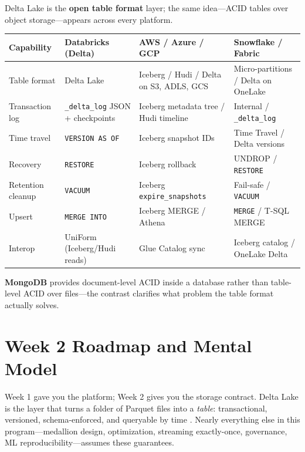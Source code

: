 \begin{crosscloud}
Delta Lake is the \textbf{open table format} layer; the same idea---ACID tables over object
storage---appears across every platform.

\vspace{2mm}
{\footnotesize
\begin{tabular}{@{}p{3.0cm}p{3.4cm}p{3.2cm}p{3.2cm}@{}}
\toprule
\textbf{Capability} & \textbf{Databricks (Delta)} & \textbf{AWS / Azure / GCP} & \textbf{Snowflake / Fabric} \\
\midrule
Table format & Delta Lake & Iceberg / Hudi / Delta on S3, ADLS, GCS & Micro-partitions / Delta on OneLake \\
Transaction log & \texttt{\_delta\_log} JSON + checkpoints & Iceberg metadata tree / Hudi timeline & Internal / \texttt{\_delta\_log} \\
Time travel & \texttt{VERSION AS OF} & Iceberg snapshot IDs & Time Travel / Delta versions \\
Recovery & \texttt{RESTORE} & Iceberg rollback & UNDROP / \texttt{RESTORE} \\
Retention cleanup & \texttt{VACUUM} & Iceberg \texttt{expire\_snapshots} & Fail-safe / \texttt{VACUUM} \\
Upsert & \texttt{MERGE INTO} & Iceberg MERGE / Athena & \texttt{MERGE} / T-SQL MERGE \\
\addlinespace
Interop & UniForm (Iceberg/Hudi reads) & Glue Catalog sync & Iceberg catalog / OneLake Delta \\
\bottomrule
\end{tabular}}

\vspace{1mm}
\textbf{MongoDB} provides document-level ACID inside a database rather than table-level ACID over
files---the contrast clarifies what problem the table format actually solves.
\end{crosscloud}

\section{Week 2 Roadmap and Mental Model}
Week 1 gave you the platform; Week 2 gives you the storage contract. Delta Lake is the layer that turns a folder of Parquet files into a \emph{table}: transactional, versioned, schema-enforced, and queryable by time \cite{armbrust2020delta}. Nearly everything else in this program---medallion design, optimization, streaming exactly-once, governance, ML reproducibility---assumes these guarantees.

